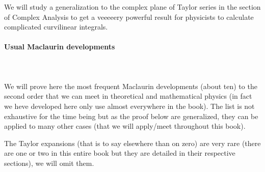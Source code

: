	We will study a generalization to the complex plane of Taylor series in the section of Complex Analysis to get a veeeeery powerful result for physicists to calculate complicated curvilinear integrals.
	
	\pagebreak
	\paragraph{Usual Maclaurin developments}\mbox{}\\\\
	We will prove here the most frequent Maclaurin developments (about ten) to the second order that we can meet in theoretical and mathematical physics (in fact we heve developed here only use almost everywhere in the book). The list is not exhaustive for the time being but as the proof below are generalized, they can be applied to many other cases (that we will apply/meet throughout this book).
	
	\begin{tcolorbox}[title=Remarks,colframe=black,arc=10pt]
	The Taylor expansions (that is to say elsewhere than on zero) are very rare (there are one or two in this entire book but they are detailed in their respective sections), we will omit them.
	\end{tcolorbox}
	
